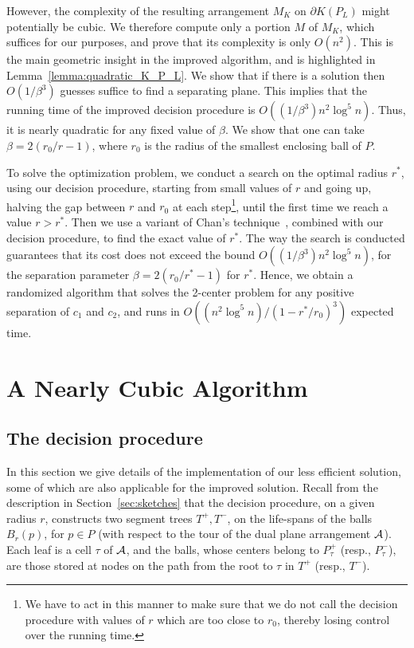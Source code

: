 \documentclass[a4paper,12pt]{article}
\def\A{{\cal A}}
\def\bd{{\partial}}
\begin{document}
However, the complexity of the resulting arrangement $M_K$ on
$\bd{K(P_L)}$ might potentially be cubic. We therefore compute only
a portion $M$ of $M_K$, which suffices for our purposes, and prove
that its complexity is only $O(n^2)$. This is the main geometric
insight in the improved algorithm, and is highlighted in
Lemma~\ref{lemma:quadratic_K_P_L}. We show that if there is a
solution then $O(1/\beta^3)$ guesses suffice to find a separating
plane. This implies that the running time of the improved decision
procedure is $O((1/\beta^3) n^2\log^5 n)$. Thus, it is nearly
quadratic for any fixed value of $\beta$. We show that one can take
$\beta = 2(r_0/r -1)$, where $r_0$ is the radius of the smallest
enclosing ball of $P$.

To solve the optimization problem, we conduct a search on the
optimal radius $r^*$, using our decision procedure, starting from
small values of $r$ and going up, halving the gap between $r$ and
$r_0$ at each step\footnote{\small We have to act in this manner to
make sure that we do not call the decision procedure with values of
$r$ which are too close to $r_0$, thereby losing control over the
running time.}, until the first time we reach a value $r > r^*$.
Then we use a variant of Chan's technique~\cite{TCG}, combined with
our decision procedure, to find the exact value of $r^*$. The way
the search is conducted guarantees that its cost does not exceed the
bound $O((1/\beta^3) n^2 \log^5 n)$, for the separation parameter
$\beta = 2(r_0/r^* -1)$ for $r^*$. Hence, we obtain a randomized
algorithm that solves the 2-center problem for any positive
separation of $c_1$ and $c_2$, and runs in $O((n^2 \log^5 n)
/(1-r^*/r_0)^3)$ expected time.



\section{A Nearly Cubic Algorithm}
\label{sec:cubic_alg}

\subsection{The decision procedure}
\label{subsec:decision_procedure} In this section we give details of
the implementation of our less efficient solution, some of which are
also applicable for the improved solution. Recall from the
description in Section~\ref{sec:sketches} that the decision
procedure, on a given radius $r$, constructs two segment trees $T^+,
T^-$, on the life-spans of the balls $B_r(p)$, for $p \in P$ (with
respect to the tour of the dual plane arrangement $\A$). Each leaf
is a cell $\tau$ of $\A$, and the balls, whose centers belong to
$P_\tau^+$ (resp., $P_\tau^-$), are those stored at nodes on the
path from the root to $\tau$ in $T^+$ (resp., $T^-$).
\end{document}
